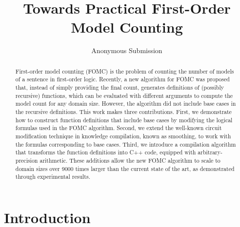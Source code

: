 \documentclass[letterpaper]{article} %
\title{Towards Practical First-Order Model Counting}
\author{Anonymous Submission}
\theoremstyle{remark}
\theoremstyle{definition}
\begin{document}
\maketitle

\begin{abstract}
  First-order model counting (FOMC) is the problem of counting the number of
  models of a sentence in first-order logic. Recently, a new algorithm for FOMC
  was proposed that, instead of simply providing the final count, generates
  definitions of (possibly recursive) functions, which can be evaluated with
  different arguments to compute the model count for any domain size. However,
  the algorithm did not include base cases in the recursive definitions. This
  work makes three contributions. First, we demonstrate how to construct
  function definitions that include base cases by modifying the logical formulas
  used in the FOMC algorithm. Second, we extend the well-known circuit
  modification technique in knowledge compilation, known as smoothing, to work
  with the formulas corresponding to base cases. Third, we introduce a
  compilation algorithm that transforms the function definitions into C++ code,
  equipped with arbitrary-precision arithmetic. These additions allow the new
  FOMC algorithm to scale to domain sizes over \num{9000} times larger than the
  current state of the art, as demonstrated through experimental results.
\end{abstract}




\section{Introduction}

\end{document}
